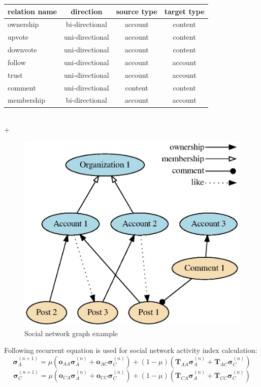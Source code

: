 \documentclass[a4paper,12pt]{article}
\begin{document}
\begin{tabular}{|l|c|c|c|}
\hline
 relation name & direction & source type & target type\\
\hline
 ownership & bi-directional & account & content \\
 upvote & uni-directional & account & content \\
 downvote & uni-directional & account & content \\
 follow & uni-directional & account & account \\
 trust & uni-directional & account & account \\
 comment & uni-directional & content & content \\
 membership & bi-directional & account & account \\
\hline
\end{tabular}
\\ 
+
\begin{figure}[h]
      \includegraphics[width=1\linewidth]{pictures/graph_example.eps}
      \caption{Social network graph example}
      \label{fig:sigmoida}
\end{figure}


Following recurrent equation is used for social network activity index calculation:
$$
    \boldsymbol{\sigma}^{(n+1)}_A = \mu (\boldsymbol{o}_{AA} \boldsymbol{\sigma}^{(n)}_A + \boldsymbol{o}_{AC} \boldsymbol{\sigma}^{(n)}_C) + (1-\mu) (\boldsymbol{T}_{AA} \boldsymbol{\sigma}^{(n)}_A + \boldsymbol{T}_{AC} \boldsymbol{\sigma}^{(n)}_C)
$$
$$
    \boldsymbol{\sigma}^{(n+1)}_C = \mu (\boldsymbol{o}_{CA} \boldsymbol{\sigma}^{(n)}_A + \boldsymbol{o}_{CC} \boldsymbol{\sigma}^{(n)}_C) + (1-\mu) (\boldsymbol{T}_{CA} \boldsymbol{\sigma}^{(n)}_A + \boldsymbol{T}_{CC} \boldsymbol{\sigma}^{(n)}_C)
$$
\end{document}

